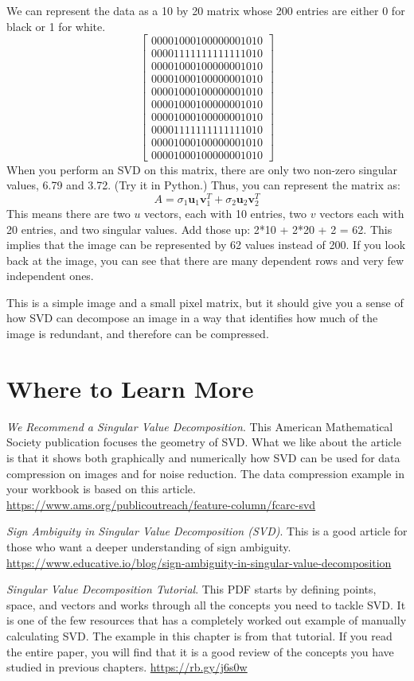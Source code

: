 We can represent the data as a 10 by 20 matrix whose 200 entries are either 0 for black or 1 for white. 
$$
\begin{bmatrix}
0 0 0 0 1 0 0 0 1 0 0 0 0 0 0 0 1 0 1 0\\
0 0 0 0 1 1 1 1 1 1 1 1 1 1 1 1 1 0 1 0\\
0 0 0 0 1 0 0 0 1 0 0 0 0 0 0 0 1 0 1 0\\
0 0 0 0 1 0 0 0 1 0 0 0 0 0 0 0 1 0 1 0\\
0 0 0 0 1 0 0 0 1 0 0 0 0 0 0 0 1 0 1 0\\
0 0 0 0 1 0 0 0 1 0 0 0 0 0 0 0 1 0 1 0\\
0 0 0 0 1 0 0 0 1 0 0 0 0 0 0 0 1 0 1 0\\
0 0 0 0 1 1 1 1 1 1 1 1 1 1 1 1 1 0 1 0\\
0 0 0 0 1 0 0 0 1 0 0 0 0 0 0 0 1 0 1 0\\
0 0 0 0 1 0 0 0 1 0 0 0 0 0 0 0 1 0 1 0
\end{bmatrix}
$$
When you perform an SVD on this matrix, there are only two non-zero singular values, 6.79 and 3.72. (Try it in Python.) Thus, you can represent the matrix as:
$$
A = \sigma_1 \mathbf{u}_1 \mathbf{v}_1^T + \sigma_2 \mathbf{u}_2 \mathbf{v}_2^T
$$
This means there are two $u$ vectors, each with 10 entries, two $v$ vectors each with 20 entries, and two singular values. Add those up: 2*10 + 2*20 + 2 = 62. This implies that the image can be represented by 62 values instead of 200. If you look back at the image, you can see that there are many dependent rows and very few independent ones. 

This is a simple image and a small pixel matrix, but it should give you a sense of how SVD can decompose an image in a way that identifies how much of the image is redundant, and therefore can be compressed.

\section{Where to Learn More}
\emph {We Recommend a Singular Value Decomposition}. This American Mathematical Society publication focuses the geometry of SVD. What we like about the article is that it shows both graphically and numerically how SVD can be used for data compression on images and for noise reduction. The data compression example in your workbook is based on this article. \url{https://www.ams.org/publicoutreach/feature-column/fcarc-svd}

\emph {Sign Ambiguity in Singular Value Decomposition (SVD)}. This is a good article for those who want a deeper understanding of sign ambiguity. \url{https://www.educative.io/blog/sign-ambiguity-in-singular-value-decomposition}

\emph {Singular Value Decomposition Tutorial}. This PDF starts by defining points, space, and vectors and works through all the concepts you need to tackle SVD. It is one of the few resources that has a completely worked out example of manually calculating SVD. The example in this chapter is from that tutorial. If you read the entire paper, you will find that it is a good review of the concepts you have studied in previous chapters. \url{https://rb.gy/j6s0w}
